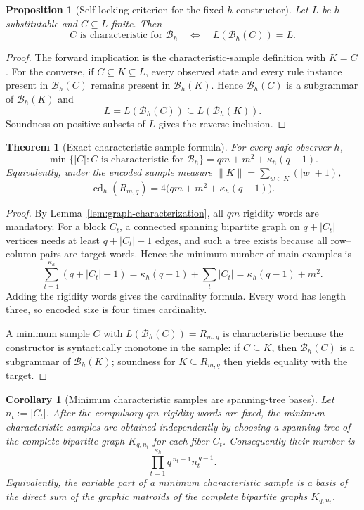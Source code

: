 \documentclass[11pt]{article}
\newtheorem{proposition}[definition]{Proposition}
\newtheorem{theorem}[definition]{Theorem}
\newtheorem{corollary}[definition]{Corollary}
\newcommand{\cd}{\operatorname{cd}}
\newcommand{\B}{\mathcal B}
\begin{document}
\begin{proposition}[Self-locking criterion for the fixed-$h$ constructor]
\label{prop:self-locking}
Let $L$ be $h$-substitutable and $C\subseteq L$ finite.  Then
\[
 C\text{ is characteristic for }\B_h
 \quad\Longleftrightarrow\quad
 L(\B_h(C))=L.
\]
\end{proposition}

\begin{proof}
The forward implication is the characteristic-sample definition with $K=C$.
For the converse, if $C\subseteq K\subseteq L$, every observed state and every
rule instance present in $\B_h(C)$ remains present in $\B_h(K)$.  Hence
$\B_h(C)$ is a subgrammar of $\B_h(K)$ and
\[
 L=L(\B_h(C))\subseteq L(\B_h(K)).
\]
Soundness on positive subsets of $L$ gives the reverse inclusion.
\end{proof}

\begin{theorem}[Exact characteristic-sample formula]
\label{thm:cd}
For every safe observer $h$,
\[
 \min\{|C|:C\text{ is characteristic for }\B_h\}
 =qm+m^2+\kappa_h(q-1).
\]
Equivalently, under the encoded sample measure
$\|K\|=\sum_{w\in K}(|w|+1)$,
\[
 \boxed{\cd_h(R_{m,q})
 =4\bigl(qm+m^2+\kappa_h(q-1)\bigr).}
\]
\end{theorem}

\begin{proof}
By Lemma~\ref{lem:graph-characterization}, all $qm$ rigidity words are
mandatory.  For a block $C_t$, a connected spanning bipartite graph on
$q+|C_t|$ vertices needs at least $q+|C_t|-1$ edges, and such a tree exists
because all row--column pairs are target words.  Hence the minimum number of
main examples is
\[
 \sum_{t=1}^{\kappa_h}(q+|C_t|-1)
 =\kappa_h(q-1)+\sum_t|C_t|
 =\kappa_h(q-1)+m^2.
\]
Adding the rigidity words gives the cardinality formula.  Every word has
length three, so encoded size is four times cardinality.

A minimum sample $C$ with $L(\B_h(C))=R_{m,q}$ is characteristic because the
constructor is syntactically monotone in the sample: if $C\subseteq K$, then
$\B_h(C)$ is a subgrammar of $\B_h(K)$; soundness for $K\subseteq R_{m,q}$
then yields equality with the target.
\end{proof}

\begin{corollary}[Minimum characteristic samples are spanning-tree bases]
\label{cor:tree-count}
Let $n_t:=|C_t|$.  After the compulsory $qm$ rigidity words are fixed, the
minimum characteristic samples are obtained independently by choosing a
spanning tree of the complete bipartite graph $K_{q,n_t}$ for each fiber
$C_t$.  Consequently their number is
\[
 \boxed{
 \prod_{t=1}^{\kappa_h} q^{\,n_t-1} n_t^{\,q-1}.
 }
\]
Equivalently, the variable part of a minimum characteristic sample is a basis
of the direct sum of the graphic matroids of the complete bipartite graphs
$K_{q,n_t}$.
\end{corollary}
\end{document}
